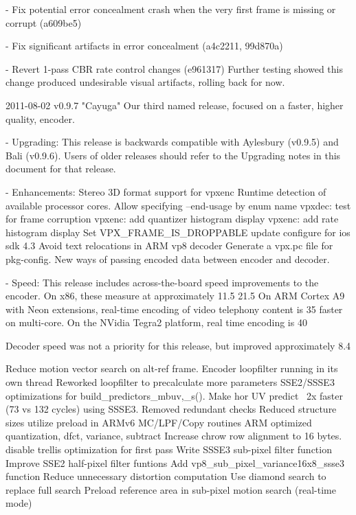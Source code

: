 \begin{DoxyVerbInclude}
    - Fix potential error concealment crash when the very first frame
      is missing or corrupt (a609be5)

    - Fix significant artifacts in error concealment (a4c2211, 99d870a)

    - Revert 1-pass CBR rate control changes (e961317)
      Further testing showed this change produced undesirable visual
      artifacts, rolling back for now.


2011-08-02 v0.9.7 "Cayuga"
  Our third named release, focused on a faster, higher quality, encoder.

  - Upgrading:
    This release is backwards compatible with Aylesbury (v0.9.5) and
    Bali (v0.9.6). Users of older releases should refer to the Upgrading
    notes in this document for that release.

  - Enhancements:
          Stereo 3D format support for vpxenc
          Runtime detection of available processor cores.
          Allow specifying --end-usage by enum name
          vpxdec: test for frame corruption
          vpxenc: add quantizer histogram display
          vpxenc: add rate histogram display
          Set VPX_FRAME_IS_DROPPABLE
          update configure for ios sdk 4.3
          Avoid text relocations in ARM vp8 decoder
          Generate a vpx.pc file for pkg-config.
          New ways of passing encoded data between encoder and decoder.

  - Speed:
      This release includes across-the-board speed improvements to the
      encoder. On x86, these measure at approximately 11.5%
      21.5%
      On ARM Cortex A9 with Neon extensions, real-time encoding of video
      telephony content is 35%
      faster on multi-core. On the NVidia Tegra2 platform, real time
      encoding is 40%

      Decoder speed was not a priority for this release, but improved
      approximately 8.4%

          Reduce motion vector search on alt-ref frame.
          Encoder loopfilter running in its own thread
          Reworked loopfilter to precalculate more parameters
          SSE2/SSSE3 optimizations for build_predictors_mbuv{,_s}().
          Make hor UV predict ~2x faster (73 vs 132 cycles) using SSSE3.
          Removed redundant checks
          Reduced structure sizes
          utilize preload in ARMv6 MC/LPF/Copy routines
          ARM optimized quantization, dfct, variance, subtract
          Increase chrow row alignment to 16 bytes.
          disable trellis optimization for first pass
          Write SSSE3 sub-pixel filter function
          Improve SSE2 half-pixel filter funtions
          Add vp8_sub_pixel_variance16x8_ssse3 function
          Reduce unnecessary distortion computation
          Use diamond search to replace full search
          Preload reference area in sub-pixel motion search (real-time mode)


\end{DoxyVerbInclude}
